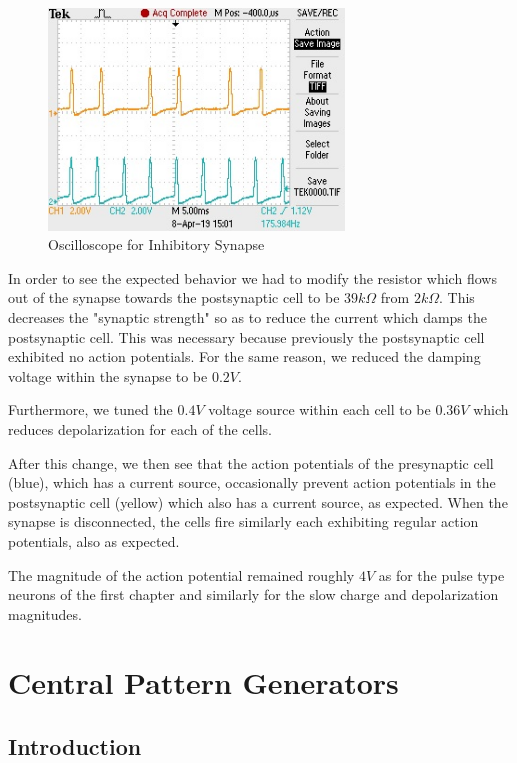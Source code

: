 \documentclass[12]{book}
\newcommand\0{\mathbf{0}}
\newcommand\<{\langle}
\renewcommand\>{\rangle}
\begin{document}
\begin{figure}[H]
\centering
\includegraphics[width=0.7\textwidth]{inhibitory.jpg}	
\caption{Oscilloscope for Inhibitory Synapse}
\end{figure}

In order to see the expected behavior we had to modify the resistor which flows out of the synapse towards the postsynaptic cell to be $39k \Omega$ from $2k \Omega$. This decreases the "synaptic strength" so as to reduce the current which damps the postsynaptic cell. This was necessary because previously the postsynaptic cell exhibited no action potentials. For the same reason, we reduced the damping voltage within the synapse to be $0.2 V$. 

Furthermore, we tuned the $0.4 V$ voltage source within each cell to be $0.36 V$ which reduces depolarization for each of the cells. 

After this change, we then see that the action potentials of the presynaptic cell (blue), which has a current source, occasionally prevent action potentials in the postsynaptic cell (yellow) which also has a current source, as expected. When the synapse is disconnected, the cells fire similarly each exhibiting regular action potentials, also as expected.

The magnitude of the action potential remained roughly $4V$ as for the pulse type neurons of the first chapter and similarly for the slow charge and depolarization magnitudes. 
\chapter{Central Pattern Generators}

\section{Introduction}
\end{document}
